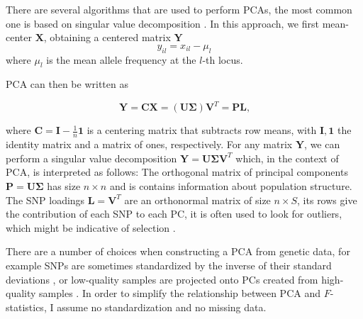 \documentclass[12pt,fullpage, a4paper]{article}
\newcommand{\MX}{\mathbf{X}} %
\newcommand{\MC}{\mathbf{C}} %
\newcommand{\MY}{\mathbf{Y}} %
\newcommand{\MP}{\mathbf{P}} %
\newcommand{\ML}{\mathbf{L}} %
\newcommand{\MSINGULAR}{\mathbf{\Sigma}} %
\begin{document}
	
There are several algorithms that are used to perform PCAs, the most common one is based on singular value decomposition \citep{jolliffe2013}. In this approach, we first mean-center $\MX$, obtaining a centered matrix $\MY$
	\begin{equation*}
	y_{il} = x_{il} - \mu_l
	\end{equation*}
	where $\mu_l$ is the mean allele frequency at the $l$-th locus.
	
	PCA can then be written as
	
	\begin{equation}
	\MY = \MC\MX = (\mathbf{U} \MSINGULAR) \mathbf{V}^T = \MP\ML\text{,}
	\end{equation}
	
	where $\MC = \mathbf{I} -\frac{1}{n}\mathbf{1}$ is a centering matrix that subtracts row means, with $\mathbf{I}, \mathbf{1}$  the identity matrix and a matrix of ones, respectively. For any matrix $\MY$, we can perform a singular value decomposition $\MY = \mathbf{U}\MSINGULAR\mathbf{V}^T$ which, in the context of PCA, is interpreted as follows: The orthogonal matrix of principal components $\MP=\mathbf{U}\MSINGULAR$ has size $n \times n$ and is contains information about population structure. The SNP loadings $\ML=\mathbf{V}^T$ are an orthonormal matrix of size $n \times S$, its rows give the contribution of each SNP to each PC, it is often used to look for outliers, which might be indicative of selection \citep[e.g][]{francois2010}.
	
	There are a number of choices when constructing a PCA from genetic data, for example SNPs are sometimes standardized by the inverse of their standard deviations \citep{patterson2006}, or low-quality samples are projected onto PCs created from high-quality samples \citep{patterson2006}. In order to simplify the relationship between PCA and $F$-statistics, I assume no standardization and no missing data. 
\end{document}
